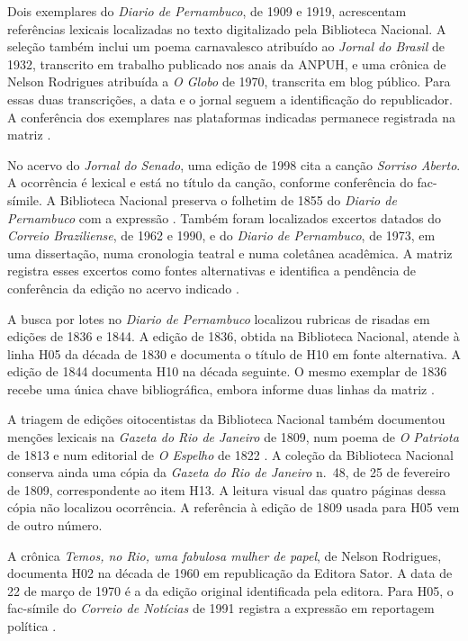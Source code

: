Dois exemplares do \textit{Diario de Pernambuco}, de 1909 e 1919, acrescentam referências lexicais localizadas no texto digitalizado pela Biblioteca Nacional. A seleção também inclui um poema carnavalesco atribuído ao \textit{Jornal do Brasil} de 1932, transcrito em trabalho publicado nos anais da ANPUH, e uma crônica de Nelson Rodrigues atribuída a \textit{O Globo} de 1970, transcrita em blog público. Para essas duas transcrições, a data e o jornal seguem a identificação do republicador. A conferência dos exemplares nas plataformas indicadas permanece registrada na matriz \cite{acervoD086,acervoD087,acervoD088,acervoD089}.

No acervo do \textit{Jornal do Senado}, uma edição de 1998 cita a canção \textit{Sorriso Aberto}. A ocorrência é lexical e está no título da canção, conforme conferência do fac-símile. A Biblioteca Nacional preserva o folhetim de 1855 do \textit{Diario de Pernambuco} com a expressão . Também foram localizados excertos datados do \textit{Correio Braziliense}, de 1962 e 1990, e do \textit{Diario de Pernambuco}, de 1973, em uma dissertação, numa cronologia teatral e numa coletânea acadêmica. A matriz registra esses excertos como fontes alternativas e identifica a pendência de conferência da edição no acervo indicado \cite{acervoD090,acervoD091,acervoD092,acervoD093,acervoD094}.

A busca por lotes no \textit{Diario de Pernambuco} localizou rubricas de risadas em edições de 1836 e 1844. A edição de 1836, obtida na Biblioteca Nacional, atende à linha H05 da década de 1830 e documenta o título de H10 em fonte alternativa. A edição de 1844 documenta H10 na década seguinte. O mesmo exemplar de 1836 recebe uma única chave bibliográfica, embora informe duas linhas da matriz \cite{acervoD095,acervoD097}.

A triagem de edições oitocentistas da Biblioteca Nacional também documentou menções lexicais na \textit{Gazeta do Rio de Janeiro} de 1809, num poema de \textit{O Patriota} de 1813 e num editorial de \textit{O Espelho} de 1822 \cite{acervoD098,acervoD099,acervoD100}. A coleção da Biblioteca Nacional conserva ainda uma cópia da \textit{Gazeta do Rio de Janeiro} n.~48, de 25 de fevereiro de 1809, correspondente ao item H13. A leitura visual das quatro páginas dessa cópia não localizou ocorrência. A referência à edição de 1809 usada para H05 vem de outro número.

A crônica \textit{Temos, no Rio, uma fabulosa mulher de papel}, de Nelson Rodrigues, documenta H02 na década de 1960 em republicação da Editora Sator. A data de 22 de março de 1970 é a da edição original identificada pela editora. Para H05, o fac-símile do \textit{Correio de Notícias} de 1991 registra a expressão  em reportagem política \cite{acervoD101,acervoD102}.

